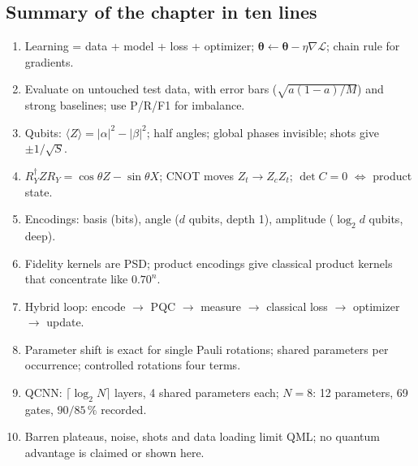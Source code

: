\documentclass[11pt,a4paper,openany]{book}
\newcommand{\bt}{\boldsymbol\theta}
\begin{document}
\subsection*{Summary of the chapter in ten lines}
\begin{enumerate}[itemsep=1pt]
\item Learning = data + model + loss + optimizer; $\bt \leftarrow \bt - \eta\nabla\mathcal L$; chain rule for gradients.
\item Evaluate on untouched test data, with error bars ($\sqrt{a(1 - a)/M}$) and strong baselines; use P/R/F1 for imbalance.
\item Qubits: $\langle Z\rangle = |\alpha|^2 - |\beta|^2$; half angles; global phases invisible; shots give $\pm1/\sqrt S$.
\item $R_Y^\dagger ZR_Y = \cos\theta Z - \sin\theta X$; CNOT moves $Z_t \to Z_cZ_t$; $\det C = 0$ $\iff$ product state.
\item Encodings: basis (bits), angle ($d$ qubits, depth 1), amplitude ($\log_2d$ qubits, deep).
\item Fidelity kernels are PSD; product encodings give classical product kernels that concentrate like $0.70^n$.
\item Hybrid loop: encode $\to$ PQC $\to$ measure $\to$ classical loss $\to$ optimizer $\to$ update.
\item Parameter shift is exact for single Pauli rotations; shared parameters per occurrence; controlled rotations four terms.
\item QCNN: $\lceil\log_2N\rceil$ layers, 4 shared parameters each; $N = 8$: 12 parameters, 69 gates, $90/85\,\%$ recorded.
\item Barren plateaus, noise, shots and data loading limit QML; no quantum advantage is claimed or shown here.
\end{enumerate}
\end{document}
